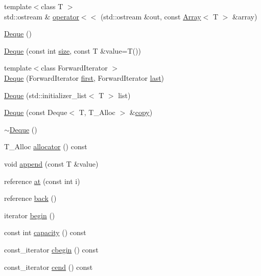 \begin{DoxyCompactItemize}
\item 
{\footnotesize template$<$class T $>$ }\\std\+::ostream \& \hyperlink{namespaceprism_a403ca8f79c481a89132691c0fd8c3a06}{operator$<$$<$} (std\+::ostream \&out, const \hyperlink{classprism_1_1_array}{Array}$<$ T $>$ \&array)
\item 
\hyperlink{namespaceprism_a8e77ed12f9b3a35d81935362d3050d0c}{Deque} ()
\item 
\hyperlink{namespaceprism_a73ec48544ee84c6327a63ac5c4c5cb60}{Deque} (const int \hyperlink{namespaceprism_acd3c0f96adf158a29387191d79c4d874}{size}, const T \&value=T())
\item 
{\footnotesize template$<$class Forward\+Iterator $>$ }\\\hyperlink{namespaceprism_aa7bbb75108907fb0573f35d3b82ddf3a}{Deque} (Forward\+Iterator \hyperlink{namespaceprism_ae3fb7a1926a9e8e59300cd5e370470da}{first}, Forward\+Iterator \hyperlink{namespaceprism_abe4956c4e865f55ca126b7fb973b5078}{last})
\item 
\hyperlink{namespaceprism_a6d8b2ede230218b04aa9b6f48c94f77d}{Deque} (std\+::initializer\+\_\+list$<$ T $>$ list)
\item 
\hyperlink{namespaceprism_af8a6c6b9242eb9a0c22af9e28ee4ae80}{Deque} (const Deque$<$ T, T\+\_\+\+Alloc $>$ \&\hyperlink{namespaceprism_ae776f4cd825f79e7af1cf6ee1d90a209}{copy})
\item 
\hyperlink{namespaceprism_a331c22c8877ca45c3f9504b1fbfb711c}{$\sim$\+Deque} ()
\item 
T\+\_\+\+Alloc \hyperlink{namespaceprism_af48d4e417d7dc90cd7979795347e1718}{allocator} () const 
\item 
void \hyperlink{namespaceprism_afc3c0da5e0e065dd58d686f551746982}{append} (const T \&value)
\item 
reference \hyperlink{namespaceprism_a675cbab48f22d95f990b33294a447dfe}{at} (const int i)
\item 
reference \hyperlink{namespaceprism_a32fa4c8645ce4e3df7586e5a9f50c768}{back} ()
\item 
iterator \hyperlink{namespaceprism_a05fcc740caf535a0f4ee6bba7301cf7f}{begin} ()
\item 
const int \hyperlink{namespaceprism_a7f11d607fd7daaeaf07d7b83e1add209}{capacity} () const 
\item 
const\+\_\+iterator \hyperlink{namespaceprism_acd7a4333c9a67559cfd90bb6d1c85420}{cbegin} () const 
\item 
const\+\_\+iterator \hyperlink{namespaceprism_a0247b88b3e29f34b1cb742d724a6a330}{cend} () const 

\end{DoxyCompactItemize}

